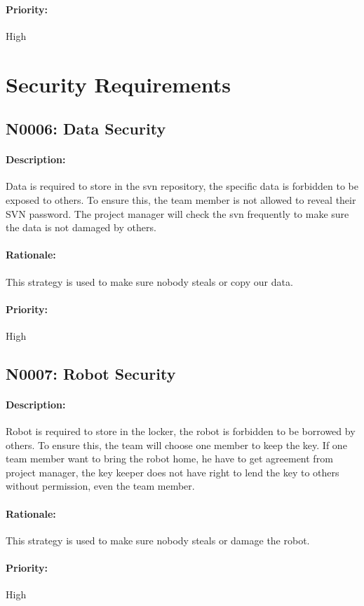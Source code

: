 \documentclass[11pt, a4paper]{report}
\begin{document}
\paragraph{Priority:}
High

\section{Security Requirements}
\subsection{N0006: Data Security}
\paragraph{Description:}
Data is required to store in the svn repository, the specific data is forbidden to be exposed to others. To ensure this, the team member is not allowed to reveal their SVN password. The project manager will check the svn frequently to make sure the data is not damaged by others.
\paragraph{Rationale:}
This strategy is used to make sure nobody steals or copy our data.
\paragraph{Priority:}
High
\subsection{N0007: Robot Security}
\paragraph{Description:}
Robot is required to store in the locker, the robot is forbidden to be borrowed by others. To ensure this, the team will choose one member to keep the key. If one team member want to bring the robot home, he have to get agreement from project manager, the key keeper does not have right to lend the key to others without permission, even the team member. 
\paragraph{Rationale:}
This strategy is used to make sure nobody steals or damage the robot.
\paragraph{Priority:}
High
\end{document}
